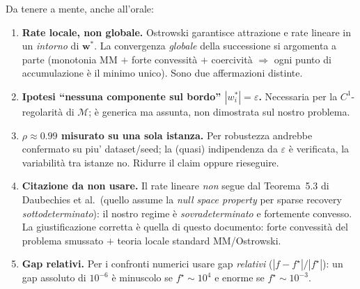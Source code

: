 \documentclass[11pt,a4paper]{article}
\theoremstyle{definition}
\newcommand{\w}{\bm{w}}
\newcommand{\wstar}{\w^{*}}
\newcommand{\Mmap}{\mathcal{M}}
\newcommand{\spec}{\rho}
\newcommand{\eps}{\varepsilon}
\begin{document}
Da tenere a mente, anche all'orale:
\begin{enumerate}
\item \textbf{Rate locale, non globale.} Ostrowski garantisce attrazione e rate lineare in un
  \emph{intorno} di $\wstar$. La convergenza \emph{globale} della successione si argomenta a
  parte (monotonia MM $+$ forte convessità $+$ coercività $\Rightarrow$ ogni punto di
  accumulazione è il minimo unico). Sono due affermazioni distinte.
\item \textbf{Ipotesi ``nessuna componente sul bordo'' $|w^*_i|=\eps$.} Necessaria per la
  $C^1$-regolarità di $\Mmap$; è generica ma assunta, non dimostrata sul nostro problema.
\item \textbf{$\spec\approx0.99$ misurato su una sola istanza.} Per robustezza andrebbe
  confermato su piu' dataset/seed; la (quasi) indipendenza da $\eps$ è verificata, la
  variabilità tra istanze no. Ridurre il claim oppure rieseguire.
\item \textbf{Citazione da non usare.} Il rate lineare \emph{non} segue dal Teorema~5.3 di
  Daubechies et al.\ (quello assume la \emph{null space property} per sparse recovery
  \emph{sottodeterminato}): il nostro regime è \emph{sovradeterminato} e fortemente convesso.
  La giustificazione corretta è quella di questo documento: forte convessità del problema
  smussato $+$ teoria locale standard MM/Ostrowski.
\item \textbf{Gap relativi.} Per i confronti numerici usare gap \emph{relativi}
  ($|f-f^\star|/|f^\star|$): un gap assoluto di $10^{-6}$ è minuscolo se $f^\star\sim10^4$ e
  enorme se $f^\star\sim10^{-3}$.
\end{enumerate}

\end{document}
